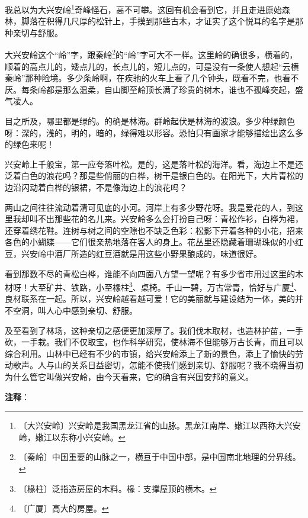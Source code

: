 \documentclass[12pt,UTF-8,openany]{ctexbook}
\begin{document}
\begin{Large}
    
    我总以为大兴安岭\footnote{〔大兴安岭〕兴安岭是我国黑龙江省的山脉。黑龙江南岸、嫩江以西称大兴安岭，嫩江以东称小兴安岭。}奇峰怪石，高不可攀。这回有机会看到它，并且走进原始森林，脚落在积得几尺厚的松针上，手摸到那些古木，才证实了这个悦耳的名字是那种亲切与舒服。
    
    大兴安岭这个“岭”字，跟秦岭\footnote{〔秦岭〕中国重要的山脉之一，横亘于中国中部，是中国南北地理的分界线。}的“岭”字可大不一样。这里岭的确很多，横着的，顺着的高点儿的，矮点儿的，长点儿的，短儿点的，可是没有一条使人想起“云横秦岭”那种险境。多少条岭啊，在疾驰的火车上看了几个钟头，既看不完，也看不厌。每条岭都是那么温柔，自山脚至岭顶长满了珍贵的树木，谁也不孤峰突起，盛气凌人。
    
    目之所及，哪里都是绿的。的确是林海。群岭起伏是林海的波浪。多少种绿颜色呀：深的，浅的，明的，暗的，绿得难以形容。恐怕只有画家才能够描绘出这么多的绿色来呢！
    
    兴安岭上千般宝，第一应夸落叶松。是的，这是落叶松的海洋。看，海边上不是还泛着白色的浪花吗？那是些俏丽的白桦，树干是银白色的。在阳光下，大片青松的边沿闪动着白桦的银裙，不是像海边上的浪花吗？
    
    两山之间往往流动着清可见底的小河。河岸上有多少野花呀。我是爱花的人，到这里我却叫不出那些花的名儿来。兴安岭多么会打扮自己呀：青松作衫，白桦为裙，还穿着绣花鞋。连树与树之间的空隙也不缺乏色彩：松影下开着各种的小花，招来各色的小蝴蝶——它们很亲热地落在客人的身上。花丛里还隐藏着珊瑚珠似的小红豆，兴安岭中酒厂所造的红豆酒就是用这些小野果酿成的，味道很好。
    
    看到那数不尽的青松白桦，谁能不向四面八方望一望呢？有多少省市用过这里的木材呀！大至矿井、铁路，小至椽柱\footnote{〔椽柱〕泛指造房屋的木料。椽：支撑屋顶的横木。}、桌椅。千山一碧，万古常青，恰好与广厦\footnote{〔广厦〕高大的房屋。}、良材联系在一起。所以，兴安岭越看越可爱！它的美丽就与建设结为一体，美的并不空洞，叫人心中感到亲切、舒服。
    
    及至看到了林场，这种亲切之感便更加深厚了。我们伐木取材，也造林护苗，一手砍，一手栽。我们不仅取宝，也作科学研究，使林海不但能够万古长青，而且可以综合利用。山林中已经有不少的市镇，给兴安岭添上了新的景色，添上了愉快的劳动歌声。人与山的关系日益密切，怎能不使我们感到亲切、舒服呢？我不晓得当初为什么管它叫做兴安岭，由今天看来，它的确含有兴国安邦的意义。
    
\end{Large}


\newpage

\textbf{注释}：
\end{document}
